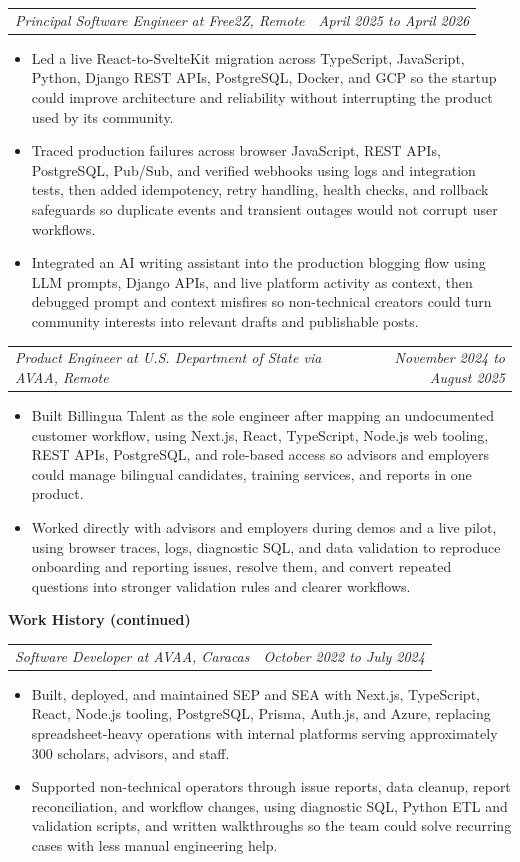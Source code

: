 \documentclass[10pt,letterpaper]{article}
\makeatletter
\newcommand{\bodyfont}{\fontsize{10.5}{15.75}\selectfont}
\newcommand{\sectiontitle}[1]{%
  \vspace{7pt}
  {\bodyfont\textbf{#1}}\par
  \nopagebreak[4]
  \vspace{4pt}
}
\newcommand{\roleline}[2]{%
  \begin{tabularx}{\textwidth}{@{}Xr@{}}
    \bodyfont\textit{#1} & \bodyfont\textit{#2}
  \end{tabularx}
  \nopagebreak[4]
  \vspace{1pt}
}
\makeatother
\begin{document}
\vspace{3pt}
\roleline{Principal Software Engineer at Free2Z, Remote}{April 2025 to April 2026}
\begin{itemize}
  \item Led a live React-to-SvelteKit migration across TypeScript, JavaScript, Python, Django REST APIs, PostgreSQL, Docker, and GCP so the startup could improve architecture and reliability without interrupting the product used by its community.
  \item Traced production failures across browser JavaScript, REST APIs, PostgreSQL, Pub/Sub, and verified webhooks using logs and integration tests, then added idempotency, retry handling, health checks, and rollback safeguards so duplicate events and transient outages would not corrupt user workflows.
  \item Integrated an AI writing assistant into the production blogging flow using LLM prompts, Django APIs, and live platform activity as context, then debugged prompt and context misfires so non-technical creators could turn community interests into relevant drafts and publishable posts.
\end{itemize}

\vspace{3pt}
\roleline{Product Engineer at U.S. Department of State via AVAA, Remote}{November 2024 to August 2025}
\begin{itemize}
  \item Built Billingua Talent as the sole engineer after mapping an undocumented customer workflow, using Next.js, React, TypeScript, Node.js web tooling, REST APIs, PostgreSQL, and role-based access so advisors and employers could manage bilingual candidates, training services, and reports in one product.
  \item Worked directly with advisors and employers during demos and a live pilot, using browser traces, logs, diagnostic SQL, and data validation to reproduce onboarding and reporting issues, resolve them, and convert repeated questions into stronger validation rules and clearer workflows.
\end{itemize}

\newpage
\sectiontitle{Work History (continued)}
\roleline{Software Developer at AVAA, Caracas}{October 2022 to July 2024}
\begin{itemize}
  \item Built, deployed, and maintained SEP and SEA with Next.js, TypeScript, React, Node.js tooling, PostgreSQL, Prisma, Auth.js, and Azure, replacing spreadsheet-heavy operations with internal platforms serving approximately 300 scholars, advisors, and staff.
  \item Supported non-technical operators through issue reports, data cleanup, report reconciliation, and workflow changes, using diagnostic SQL, Python ETL and validation scripts, and written walkthroughs so the team could solve recurring cases with less manual engineering help.
\end{itemize}
\end{document}
